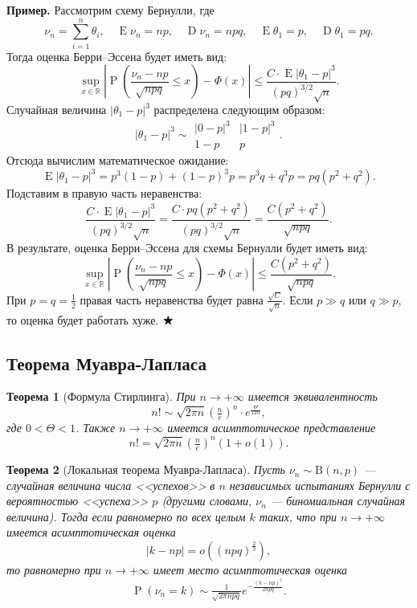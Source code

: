 \documentclass[12pt]{article}
\newtheorem{theorem}{Теорема}
\numberwithin{theorem}{section}
\theoremstyle{definition}
\newenvironment{example}{\indent \textbf{Пример.}}{$ \hfill \bigstar $}
\newcommand{\prob}{\operatorname{P}}
\newcommand{\expect}{\operatorname{E}}
\newcommand{\disp}{\operatorname{D}}
\begin{document}
	\begin{example}
		Рассмотрим схему Бернулли, где
		\[
		\nu_n = \sum_{i=1}^{n} \theta_i, \quad \expect \nu_n = np, \quad \disp \nu_n = npq, 
		\quad \expect \theta_1 = p, \quad \disp \theta_1 = pq.
		\]
		Тогда оценка Берри–Эссена будет иметь вид:
		\[
		\sup_{x \in \mathbb{R}} \left| \prob\left( \frac{\nu_n - np}{\sqrt{npq}} \leqslant x \right) - \Phi(x) \right| 
		\leqslant \frac{C \cdot \expect|\theta_1 - p|^3}{(pq)^{3/2} \sqrt{n}}.
		\]
		Случайная величина $|\theta_1 - p|^3$ распределена следующим образом:
		\[
		|\theta_1 - p|^3 \sim
		\begin{array}{cc}
			|0 - p|^3 & |1 - p|^3 \\
			1 - p & p
		\end{array}.
		\]
		Отсюда вычислим математическое ожидание:
		\[
		\expect|\theta_1 - p|^3 = p^3(1 - p) + (1 - p)^3 p = p^3 q + q^3 p = pq(p^2 + q^2).
		\]
		Подставим в правую часть неравенства:
		\[
		\frac{C \cdot \expect|\theta_1 - p|^3}{(pq)^{3/2} \sqrt{n}} = \frac{C \cdot pq(p^2 + q^2)}{(pq)^{3/2} \sqrt{n}} 
		= \frac{C(p^2 + q^2)}{\sqrt{npq}}.
		\]
		В результате, оценка Берри–Эссена для схемы Бернулли будет иметь вид:
		\[
		\sup_{x \in \mathbb{R}} \left| \prob\left( \frac{\nu_n - np}{\sqrt{npq}} \leqslant x \right) - \Phi(x) \right| 
		\leqslant \frac{C(p^2 + q^2)}{\sqrt{npq}}.
		\]
		При $p = q = \frac{1}{2}$ правая часть неравенства будет равна $\frac{\sqrt{C}}{\sqrt{n}}$. Если $p \gg q$ или $q \gg p$, то оценка будет работать хуже.
	\end{example}
	
	\subsection{Теорема Муавра-Лапласа}
	
	\begin{theorem}[Формула Стирлинга] \label{Stirling}
		При $ n \to +\infty $ имеется эквивалентность
		$$ n! \sim \sqrt{2\pi n} \left(\tfrac{n}{e}\right)^n \cdot e^{\tfrac{\Theta}{12n}}, $$
		где $ 0 < \Theta < 1 $.
		Также $ n \to +\infty $ имеется асимптотическое представление
		$$ n! = \sqrt{2\pi n} \left(\tfrac{n}{e}\right)^n(1 + o(1)). $$
	\end{theorem}
	
	\begin{theorem}[Локальная теорема Муавра-Лапласа] \label{local Muavre Laplas}
		Пусть $ \nu_n \sim \mathrm{B}(n, p) $ --- случайная величина числа <<успехов>> в $ n $ независимых испытаниях Бернулли
		с вероятностью <<успеха>> $ p $ (другими словами, $ \nu_n $ --- биномиальная случайная величина).
		Тогда если равномерно по всех целым $ k $ таких, что при $ n \to +\infty $ имеется асимптотическая оценка
		$$ |k - np| = o\left((npq)^{\tfrac{2}{3}}\right), $$
		то равномерно при $ n \to +\infty $ имеет место асимптотическая оценка
		$$ \prob(\nu_n = k) \sim \tfrac{1}{\sqrt{2\pi npq}}e^{-\tfrac{(k - np)^2}{2npq}}. $$
	\end{theorem}
	
\end{document}
